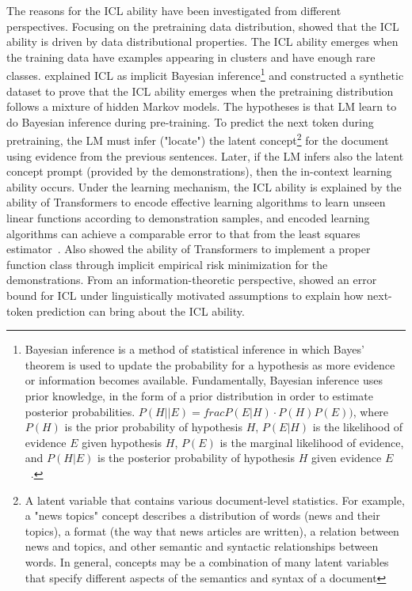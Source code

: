 The reasons for the ICL ability have been investigated from different perspectives.
Focusing on the pretraining data distribution, \textcite{chan2022data} showed that the ICL ability is driven by data distributional properties.
The ICL ability emerges when the training data have examples appearing in clusters and have enough rare classes.
\textcite{xie2022an} explained ICL as implicit Bayesian inference\footnote{
Bayesian inference is a method of statistical inference in which Bayes' theorem is used to update the probability for a hypothesis as more evidence or information becomes available. Fundamentally, Bayesian inference uses prior knowledge, in the form of a prior distribution in order to estimate posterior probabilities.
$P(H||E)=frac{P(E|H) \cdot P(H)}{P(E)})$, where $P(H)$ is the prior probability of hypothesis $H$, $P(E|H)$ is the likelihood of evidence $E$ given hypothesis $H$, $P(E)$ is the marginal likelihood of evidence, and $P(H|E)$ is the posterior probability of hypothesis $H$ given evidence $E$~\cite{wikipedia2023bayesianinference}.
} and constructed a synthetic dataset to prove that the ICL ability emerges when the pretraining distribution follows a mixture of hidden Markov models.
The hypotheses is that LM learn to do Bayesian inference during pre-training.
To predict the next token during pretraining, the LM must infer ("locate") the latent concept\footnote{A latent variable that contains various document-level statistics. For example, a "news topics" concept describes a distribution of words (news and their topics), a format (the way that news articles are written), a relation between news and topics, and other semantic and syntactic relationships between words. In general, concepts may be a combination of many latent variables that specify different aspects of the semantics and syntax of a document} for the document using evidence from the previous sentences.
Later, if the LM infers also the latent concept prompt (provided by the demonstrations), then the in-context learning ability occurs.
Under the learning mechanism, the ICL ability is explained by the ability of Transformers to encode effective learning algorithms to learn unseen linear functions according to demonstration samples, and encoded learning algorithms can achieve a comparable error to that from the least squares estimator~\cite{garg2023transformers}.
Also \textcite{li2023transformers} showed the ability of Transformers to implement a proper function class through implicit empirical risk minimization for the demonstrations.
From an information-theoretic perspective, \textcite{hahn2023theory} showed an error bound for ICL under linguistically motivated assumptions to explain how next-token prediction can bring about the ICL ability.
